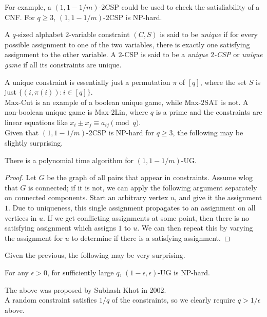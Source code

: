 	For example, a $(1,1-1/m)$-2CSP could be used to check the satisfiability of a CNF. For $q \ge 3$, $(1,1-1/m)$-2CSP is \textsf{NP}-hard.

	\begin{fdef}
		A $q$-sized alphabet $2$-variable constraint $(C,S)$ is said to be \emph{unique} if for every possible assignment to one of the two variables, there is exactly one satisfying assignment to the other variable. A $2$-CSP is said to be a \emph{unique $2$-CSP} or \emph{unique game} if all its constraints are unique. 
	\end{fdef}
	A unique constraint is essentially just a permutation $\pi$ of $[q]$, where the set $S$ is just $\{(i,\pi(i)) : i \in [q]\}$.\\
	Max-Cut is an example of a boolean unique game, while Max-$2$SAT is not. A non-boolean unique game is Max-$2$Lin, where $q$ is a prime and the constraints are linear equations like $x_i \pm x_j \equiv a_{ij} \pmod{q}$.\\

	Given that $(1,1-1/m)$-2CSP is NP-hard for $q \ge 3$, the following may be slightly surprising.
	\begin{ftheo}[Propagation]
		There is a polynomial time algorithm for $(1,1-1/m)$-UG.
	\end{ftheo}
	\begin{proof}
		Let $G$ be the graph of all pairs that appear in constraints. Assume wlog that $G$ is connected; if it is not, we can apply the following argument separately on connected components. Start an arbitrary vertex $u$, and give it the assignment $1$. Due to uniqueness, this single assignment propagates to an assignment on all vertices in $u$. If we get conflicting assignments at some point, then there is no satisfying assignment which assigns $1$ to $u$. We can then repeat this by varying the assignment for $u$ to determine if there is a satisfying assignment. 
	\end{proof}

	Given the previous, the following may be very surprising.
	\begin{fcon}
		For any $\epsilon > 0$, for sufficiently large $q$, $(1-\epsilon,\epsilon)$-UG is \textsf{NP}-hard.
	\end{fcon}
	The above was proposed by Subhash Khot in 2002.\\

	A random constraint satisfies $1/q$ of the constraints, so we clearly require $q > 1/\epsilon$ above.